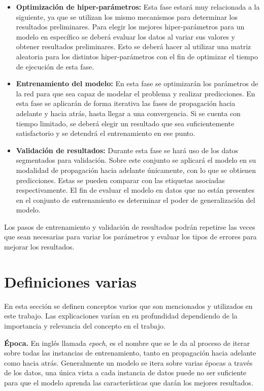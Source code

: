\begin{itemize}
\item \textbf{Optimización de hiper-parámetros:} Esta fase estará muy relacionada a la siguiente, ya que se utilizan los mismo mecanismos para determinar los resultados preliminares. Para elegir los mejores hiper-parámetros para un modelo en específico se deberá evaluar los datos al variar sus valores y obtener resultados preliminares. Esto se deberá hacer al utilizar una matriz aleatoria para los distintos hiper-parámetros con el fin de optimizar el tiempo de ejecución de esta fase.

\item \textbf{Entrenamiento del modelo:} En esta fase se optimizarán los parámetros de la red para que sea capaz de modelar el problema y realizar predicciones. En esta fase se aplicarán de forma iterativa las fases de propagación hacia adelante y hacia atrás, hasta llegar a una convergencia. Si se cuenta con tiempo limitado, se deberá elegir un resultado que sea suficientemente satisfactorio y se detendrá el entrenamiento en ese punto.

\item \textbf{Validación de resultados:} Durante esta fase se hará uso de los datos segmentados para validación. Sobre este conjunto se aplicará el modelo en su modalidad de propagación hacia adelante únicamente, con lo que se obtienen predicciones. Estas se pueden comparar con las etiquetas asociadas respectivamente. El fin de evaluar el modelo en datos que no están presentes en el conjunto de entrenamiento es determinar el poder de generalización del modelo.

\end{itemize}

Los pasos de entrenamiento y validación de resultados podrán repetirse las veces que sean necesarias para variar los parámetros y evaluar los tipos de errores para mejorar los resultados.

\section{Definiciones varias}

En esta sección se definen conceptos varios que son mencionados y utilizados en este trabajo. Las explicaciones varían en su profundidad dependiendo de la importancia y relevancia del concepto en el trabajo.

\textbf{Época.} En inglés llamada \emph{epoch}, es el nombre que se le da al proceso de iterar sobre todas las instancias de entrenamiento, tanto en propagación hacia adelante como hacia atrás. Generalmente un modelo se itera sobre varias épocas a través de los datos, una única vista a cada instancia de datos puede no ser suficiente para que el modelo aprenda las características que darán los mejores resultados.

